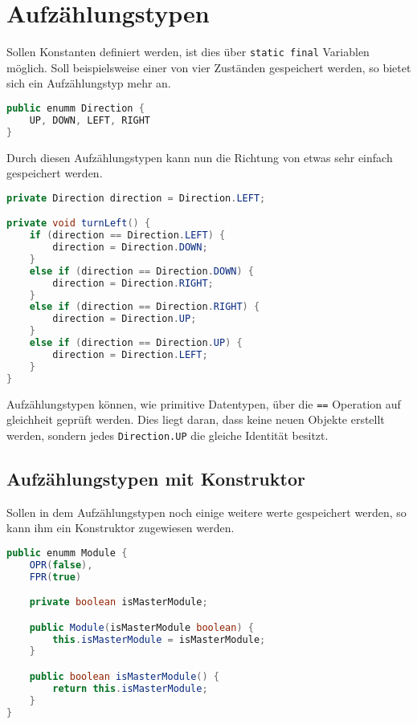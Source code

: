 \chapter{Aufzählungstypen}\label{chap:aufzaehlungstypen}

Sollen Konstanten definiert werden, ist dies über \lstinline{static final} Variablen möglich. Soll beispielsweise einer von vier Zuständen gespeichert werden, so bietet sich ein Aufzählungstyp mehr an. 

\begin{lstlisting}[language=Java, caption={Beispiel für Aufzählungstypen}]
public enumm Direction {
    UP, DOWN, LEFT, RIGHT
}
\end{lstlisting}

Durch diesen Aufzählungstypen kann nun die Richtung von etwas sehr einfach gespeichert werden.

\begin{lstlisting}[language=Java, caption={Beispiel für Aufzählungstypen}]
private Direction direction = Direction.LEFT;

private void turnLeft() {
    if (direction == Direction.LEFT) {
        direction = Direction.DOWN;
    }
    else if (direction == Direction.DOWN) {
        direction = Direction.RIGHT;
    }
    else if (direction == Direction.RIGHT) {
        direction = Direction.UP;
    }
    else if (direction == Direction.UP) {
        direction = Direction.LEFT;
    }
}
\end{lstlisting}

Aufzählungstypen können, wie primitive Datentypen, über die \lstinline{==} Operation auf gleichheit geprüft werden. Dies liegt daran, dass keine neuen Objekte erstellt werden, sondern jedes \lstinline{Direction.UP} die gleiche Identität besitzt.

\section{Aufzählungstypen mit Konstruktor}

Sollen in dem Aufzählungstypen noch einige weitere werte gespeichert werden, so kann ihm ein Konstruktor zugewiesen werden.

\begin{lstlisting}[language=Java, caption={Beispiel für Aufzählungstypen}]
public enumm Module {
    OPR(false),
    FPR(true)

    private boolean isMasterModule;

    public Module(isMasterModule boolean) {
        this.isMasterModule = isMasterModule;
    }

    public boolean isMasterModule() {
        return this.isMasterModule;
    }
}
\end{lstlisting}